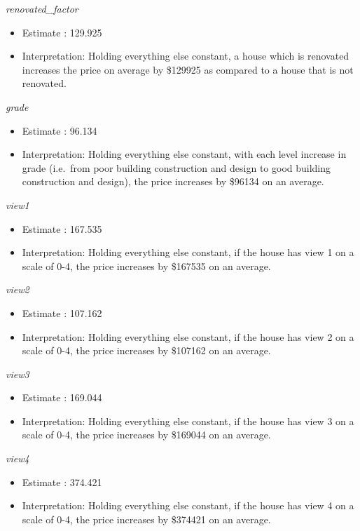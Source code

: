 \documentclass[
]{article}
\begin{document}
\emph{renovated\_factor}

\begin{itemize}
\item
  Estimate : 129.925
\item
  Interpretation: Holding everything else constant, a house which is
  renovated increases the price on average by \$129925 as compared to a
  house that is not renovated.
\end{itemize}

\emph{grade}

\begin{itemize}
\item
  Estimate : 96.134
\item
  Interpretation: Holding everything else constant, with each level
  increase in grade (i.e.~from poor building construction and design to
  good building construction and design), the price increases by \$96134
  on an average.
\end{itemize}

\emph{view1}

\begin{itemize}
\item
  Estimate : 167.535
\item
  Interpretation: Holding everything else constant, if the house has
  view 1 on a scale of 0-4, the price increases by \$167535 on an
  average.
\end{itemize}

\emph{view2}

\begin{itemize}
\item
  Estimate : 107.162
\item
  Interpretation: Holding everything else constant, if the house has
  view 2 on a scale of 0-4, the price increases by \$107162 on an
  average.
\end{itemize}

\emph{view3}

\begin{itemize}
\item
  Estimate : 169.044
\item
  Interpretation: Holding everything else constant, if the house has
  view 3 on a scale of 0-4, the price increases by \$169044 on an
  average.
\end{itemize}

\emph{view4}

\begin{itemize}
\item
  Estimate : 374.421
\item
  Interpretation: Holding everything else constant, if the house has
  view 4 on a scale of 0-4, the price increases by \$374421 on an
  average.
\end{itemize}
\end{document}
